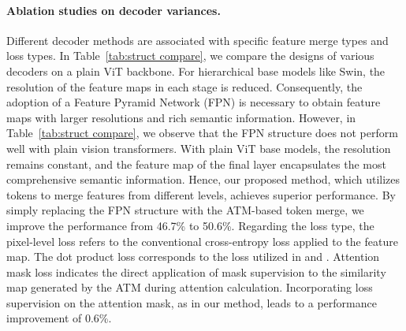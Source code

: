 \paragraph{Ablation studies on decoder variances.}
Different decoder methods are associated with specific feature merge types and loss types. In Table~\ref{tab:struct compare}, we compare the designs of various decoders on a plain ViT backbone.
For hierarchical base models like Swin, the resolution of the feature maps in each stage is reduced. Consequently, the adoption of a Feature Pyramid Network (FPN) is necessary to obtain feature maps with larger resolutions and rich semantic information. However, in Table~\ref{tab:struct compare}, we observe that the FPN structure does not perform well with plain vision transformers.
With plain ViT base models, the resolution remains constant, and the feature map of the final layer encapsulates the most comprehensive semantic information.
Hence, our proposed method, which utilizes tokens to merge features from different levels, achieves superior performance. By simply replacing the FPN structure with the ATM-based token merge, we improve the performance from 46.7\% to 50.6\%.
Regarding the loss type, the pixel-level loss refers to the conventional cross-entropy loss applied to the feature map. The dot product loss corresponds to the loss utilized in \cite{detr} and \cite{maskformer}.  
Attention mask loss indicates the direct application of mask supervision to the similarity map generated by the ATM during attention calculation. 
Incorporating loss supervision on the attention mask, as in our method, leads to a performance improvement of 0.6\%.


\newcommand{\tri}{\begin{small}\color{Green}\end{small}}
\newcommand{\trid}{\begin{small}\color{BrickRed}\end{small}}
\newcommand{\trim}{\begin{small}\color{SpringGreen}\end{small}}


